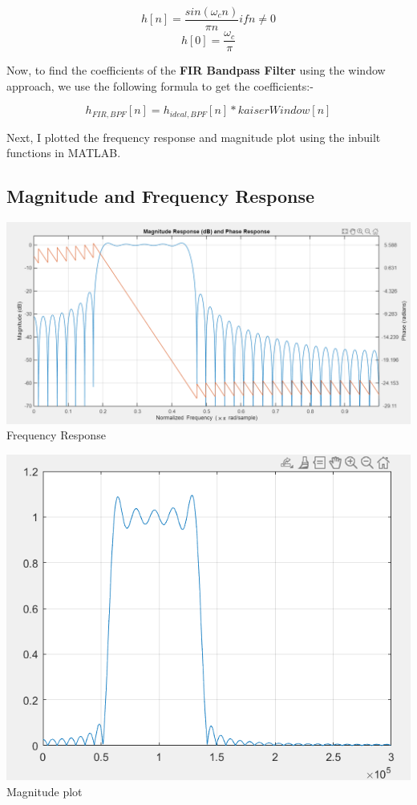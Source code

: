 \documentclass{article}
\begin{document}
\begin{equation}
    h[n] = \frac{sin(\omega_{c}n)}{\pi n} if n \neq 0
\end{equation}
\begin{equation}
    h[0] = \frac{\omega_{c}}{\pi}
\end{equation}

Now, to find the coefficients of the \textbf{FIR Bandpass Filter} using the window approach, we use the following formula to get the coefficients:-

\[h_{FIR,BPF}[n] = h_{ideal,BPF}[n]*kaiserWindow[n]\]

Next, I plotted the frequency response and magnitude plot using the inbuilt functions in MATLAB.

\subsection{Magnitude and Frequency Response}
\begin{center}
    \includegraphics[scale=0.45]{bp_fir_mag.png}\\
    Frequency Response
\end{center}

\begin{center}
    \includegraphics[scale=0.75]{bp_fir_magn.png}\\
    Magnitude plot
\end{center}
\end{document}
